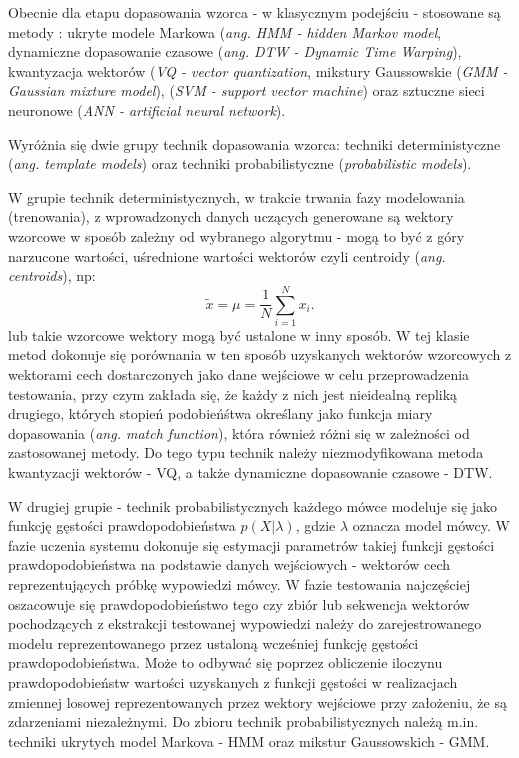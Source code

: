 Obecnie dla etapu dopasowania wzorca - w klasycznym podejściu - stosowane są metody\cite{campbell} \cite{overview}: ukryte modele Markowa (\textit{ang. HMM - hidden Markov model}, dynamiczne dopasowanie czasowe (\textit{ang. DTW - Dynamic Time Warping}), kwantyzacja wektorów (\textit{VQ - vector quantization}, mikstury Gaussowskie (\textit{GMM - Gaussian mixture model}), (\textit{SVM - support vector machine}) oraz sztuczne sieci neuronowe (\textit{ANN - artificial neural network}).

Wyróżnia się dwie grupy technik dopasowania wzorca: techniki deterministyczne (\textit{ang. template models}) oraz techniki probabilistyczne (\textit{probabilistic models})\cite{campbell}.

W grupie technik deterministycznych, w trakcie trwania fazy modelowania (trenowania), z wprowadzonych danych uczących generowane są wektory wzorcowe w sposób zależny od wybranego algorytmu - mogą to być z góry narzucone wartości, uśrednione wartości wektorów  czyli centroidy (\textit{ang. centroids}), np:
\begin{equation}
  \tilde{x} = \mu = \frac{1}{N}\sum_{i=1}^{N}x_i.
  \label{centroid}
\end{equation}
lub takie wzorcowe wektory mogą być ustalone w inny sposób. W tej klasie metod dokonuje się porównania w ten sposób uzyskanych wektorów wzorcowych z wektorami cech dostarczonych jako dane wejściowe w celu przeprowadzenia testowania, przy czym zakłada się, że \cite{overview} \cite{campbell} każdy z nich jest nieidealną repliką drugiego, których stopień podobieńśtwa określany jako funkcja miary dopasowania (\textit{ang. match function}), która również różni się w zależności od zastosowanej metody. Do tego typu technik należy niezmodyfikowana metoda kwantyzacji wektorów - VQ, a także dynamiczne dopasowanie czasowe - DTW.

W drugiej grupie - technik probabilistycznych każdego mówce modeluje się jako funkcję gęstości prawdopodobieństwa $ p(X|\lambda)$, gdzie $\lambda$ oznacza model mówcy. W fazie uczenia systemu dokonuje się estymacji parametrów takiej funkcji gęstości prawdopodobieństwa na podstawie danych wejściowych - wektorów cech reprezentujących próbkę wypowiedzi mówcy. W fazie testowania najczęściej oszacowuje się prawdopodobieństwo tego czy zbiór lub sekwencja wektorów pochodzących z ekstrakcji testowanej wypowiedzi należy do zarejestrowanego modelu reprezentowanego przez ustaloną wcześniej funkcję gęstości prawdopodobieństwa. Może to odbywać się poprzez obliczenie iloczynu prawdopodobieństw wartości uzyskanych z funkcji gęstości w realizacjach zmiennej losowej reprezentowanych przez wektory wejściowe przy założeniu, że są zdarzeniami niezależnymi. %
Do zbioru technik probabilistycznych należą m.in. techniki ukrytych model Markova - HMM oraz mikstur Gaussowskich - GMM.

